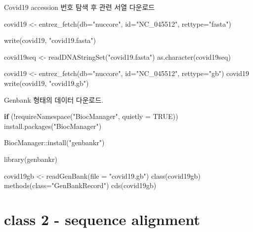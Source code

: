 \documentclass[
]{book}
\newenvironment{Shaded}{\begin{snugshade}}{\end{snugshade}}
\newcommand{\AttributeTok}[1]{\textcolor[rgb]{0.77,0.63,0.00}{#1}}
\newcommand{\ConstantTok}[1]{\textcolor[rgb]{0.00,0.00,0.00}{#1}}
\newcommand{\ControlFlowTok}[1]{\textcolor[rgb]{0.13,0.29,0.53}{\textbf{#1}}}
\newcommand{\FunctionTok}[1]{\textcolor[rgb]{0.00,0.00,0.00}{#1}}
\newcommand{\NormalTok}[1]{#1}
\newcommand{\OtherTok}[1]{\textcolor[rgb]{0.56,0.35,0.01}{#1}}
\newcommand{\SpecialCharTok}[1]{\textcolor[rgb]{0.00,0.00,0.00}{#1}}
\newcommand{\StringTok}[1]{\textcolor[rgb]{0.31,0.60,0.02}{#1}}
\begin{document}
Covid19 accession 번호 탐색 후 관련 서열 다운로드

\begin{Shaded}
\begin{Highlighting}[]
\NormalTok{covid19 }\OtherTok{\textless{}{-}} \FunctionTok{entrez\_fetch}\NormalTok{(}\AttributeTok{db=}\StringTok{"nuccore"}\NormalTok{, }\AttributeTok{id=}\StringTok{"NC\_045512"}\NormalTok{, }\AttributeTok{rettype=}\StringTok{"fasta"}\NormalTok{)}

\FunctionTok{write}\NormalTok{(covid19, }\StringTok{"covid19.fasta"}\NormalTok{)}

\NormalTok{covid19seq }\OtherTok{\textless{}{-}} \FunctionTok{readDNAStringSet}\NormalTok{(}\StringTok{"covid19.fasta"}\NormalTok{)}
\FunctionTok{as.character}\NormalTok{(covid19seq)}


\NormalTok{covid19 }\OtherTok{\textless{}{-}} \FunctionTok{entrez\_fetch}\NormalTok{(}\AttributeTok{db=}\StringTok{"nuccore"}\NormalTok{, }\AttributeTok{id=}\StringTok{"NC\_045512"}\NormalTok{, }\AttributeTok{rettype=}\StringTok{"gb"}\NormalTok{)}
\NormalTok{covid19}
\FunctionTok{write}\NormalTok{(covid19, }\StringTok{"covid19.gb"}\NormalTok{)}
\end{Highlighting}
\end{Shaded}

Genbank 형태의 데이터 다운로드.

\begin{Shaded}
\begin{Highlighting}[]
\ControlFlowTok{if}\NormalTok{ (}\SpecialCharTok{!}\FunctionTok{requireNamespace}\NormalTok{(}\StringTok{"BiocManager"}\NormalTok{, }\AttributeTok{quietly =} \ConstantTok{TRUE}\NormalTok{))}
    \FunctionTok{install.packages}\NormalTok{(}\StringTok{"BiocManager"}\NormalTok{)}

\NormalTok{BiocManager}\SpecialCharTok{::}\FunctionTok{install}\NormalTok{(}\StringTok{"genbankr"}\NormalTok{)}


\FunctionTok{library}\NormalTok{(genbankr)}

\NormalTok{covid19gb }\OtherTok{\textless{}{-}} \FunctionTok{readGenBank}\NormalTok{(}\AttributeTok{file =} \StringTok{"covid19.gb"}\NormalTok{)}
\FunctionTok{class}\NormalTok{(covid19gb)}
\FunctionTok{methods}\NormalTok{(}\AttributeTok{class=}\StringTok{"GenBankRecord"}\NormalTok{)}
\FunctionTok{cds}\NormalTok{(covid19gb)}
\end{Highlighting}
\end{Shaded}

\hypertarget{day3_class2}{%
\section{class 2 - sequence alignment}\label{day3_class2}}
\end{document}

